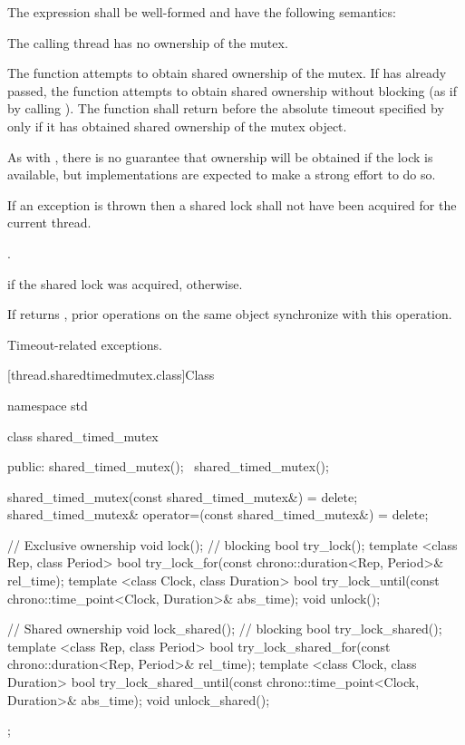 \pnum
The expression  shall be well-formed
and have the following semantics:

\begin{itemdescr}
\pnum
\requires The calling thread has no ownership of the mutex.

\pnum
\effects The function attempts to obtain shared ownership of the mutex. If
 has already passed, the function attempts to obtain shared
ownership without blocking (as if by calling ). The
function shall return before the absolute timeout
specified by  only if it has obtained shared ownership of the
mutex object. \begin{note} As with , there is no guarantee that
ownership will be obtained if the lock is available, but implementations are
expected to make a strong effort to do so. \end{note}
If an exception is thrown then a shared lock shall not have been acquired for
the current thread.

\pnum
\returntype {}.

\pnum
\returns {} if the shared lock was acquired,  otherwise.

\pnum
\sync If  returns , prior
 operations on the same object synchronize
with this operation.

\pnum
\throws Timeout-related exceptions.
\end{itemdescr}

[thread.sharedtimedmutex.class]{Class }

%
\begin{codeblock}
namespace std {
  class shared_timed_mutex {
  public:
    shared_timed_mutex();
    ~shared_timed_mutex();

    shared_timed_mutex(const shared_timed_mutex&) = delete;
    shared_timed_mutex& operator=(const shared_timed_mutex&) = delete;

    // Exclusive ownership
    void lock();  // blocking
    bool try_lock();
    template <class Rep, class Period>
      bool try_lock_for(const chrono::duration<Rep, Period>& rel_time);
    template <class Clock, class Duration>
      bool try_lock_until(const chrono::time_point<Clock, Duration>& abs_time);
    void unlock();

    // Shared ownership
    void lock_shared();  // blocking
    bool try_lock_shared();
    template <class Rep, class Period>
      bool
      try_lock_shared_for(const chrono::duration<Rep, Period>& rel_time);
    template <class Clock, class Duration>
      bool
      try_lock_shared_until(const chrono::time_point<Clock, Duration>& abs_time);
    void unlock_shared();
  };
}
\end{codeblock}


